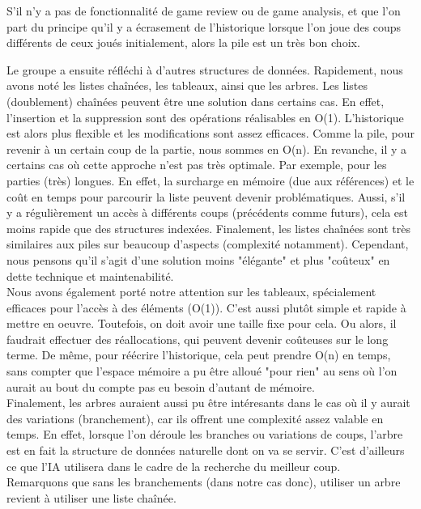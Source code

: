 \documentclass{article}
\begin{document}
S'il n'y a pas de fonctionnalité de game review ou de game analysis, et que l'on part du principe qu'il y a écrasement de l'historique
lorsque l'on joue des coups différents de ceux joués initialement, alors la pile est un très bon choix.\\

\par Le groupe a ensuite réfléchi à d'autres structures de données. Rapidement, nous avons noté les listes chaînées, les tableaux,
ainsi que les arbres.
Les listes (doublement) chaînées peuvent être une solution dans certains cas. En effet, l'insertion et la suppression sont des opérations
réalisables en O(1). L'historique est alors plus flexible et les modifications sont assez efficaces. Comme la pile, pour revenir à un
certain coup de la partie, nous sommes en O(n). En revanche, il y a certains cas où cette approche n'est pas très optimale. Par exemple,
pour les parties (très) longues. En effet, la surcharge en mémoire (due aux références) et le coût en temps pour parcourir la liste peuvent
devenir problématiques. Aussi, s'il y a régulièrement un accès à différents coups (précédents comme futurs), cela est moins rapide que des
structures indexées. Finalement, les listes chaînées sont très similaires aux piles sur beaucoup d'aspects (complexité notamment). Cependant,
nous pensons qu'il s'agit d'une solution moins "élégante" et plus "coûteux" en dette technique et maintenabilité.\\
Nous avons également porté notre attention sur les tableaux, spécialement efficaces pour l'accès à des éléments (O(1)). C'est aussi plutôt
simple et rapide à mettre en oeuvre. Toutefois, on doit avoir une taille fixe pour cela. Ou alors, il faudrait effectuer des réallocations,
qui peuvent devenir coûteuses sur le long terme. De même, pour réécrire l'historique, cela peut prendre O(n) en temps, sans compter que
l'espace mémoire a pu être alloué "pour rien" au sens où l'on aurait au bout du compte pas eu besoin d'autant de mémoire.\\
Finalement, les arbres auraient aussi pu être intéresants dans le cas où il y aurait des variations (branchement), car ils offrent une complexité
assez valable en temps. En effet, lorsque l'on déroule les branches ou variations de coups,
l'arbre est en fait la structure de données naturelle dont on va se servir. C'est d'ailleurs ce que l'IA utilisera dans le cadre de la recherche
du meilleur coup.\\
Remarquons que sans les branchements (dans notre cas donc), utiliser un arbre revient à utiliser une liste chaînée.
\end{document}
